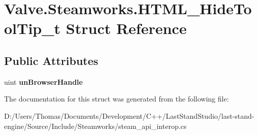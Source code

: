 \hypertarget{structValve_1_1Steamworks_1_1HTML__HideToolTip__t}{}\section{Valve.\+Steamworks.\+H\+T\+M\+L\+\_\+\+Hide\+Tool\+Tip\+\_\+t Struct Reference}
\label{structValve_1_1Steamworks_1_1HTML__HideToolTip__t}
\subsection*{Public Attributes}
\begin{DoxyCompactItemize}
\item 
\hypertarget{structValve_1_1Steamworks_1_1HTML__HideToolTip__t_ac83bde36fcfe681c52cc90f197ffc387}{}uint {\bfseries un\+Browser\+Handle}\label{structValve_1_1Steamworks_1_1HTML__HideToolTip__t_ac83bde36fcfe681c52cc90f197ffc387}

\end{DoxyCompactItemize}


The documentation for this struct was generated from the following file\+:\begin{DoxyCompactItemize}
\item 
D\+:/\+Users/\+Thomas/\+Documents/\+Development/\+C++/\+Last\+Stand\+Studio/last-\/stand-\/engine/\+Source/\+Include/\+Steamworks/steam\+\_\+api\+\_\+interop.\+cs\end{DoxyCompactItemize}
